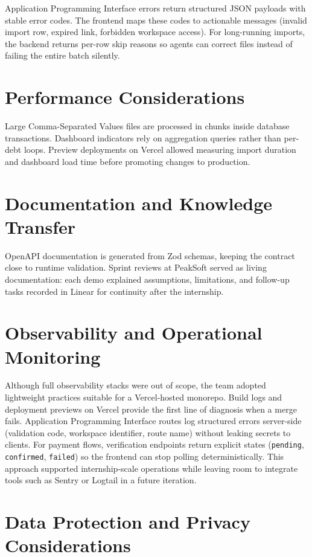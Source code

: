 \documentclass[12pt,a4paper]{report}
\begin{document}
Application Programming Interface errors return structured JSON payloads with stable error codes.
The frontend maps these codes to actionable messages (invalid import row, expired link,
forbidden workspace access).
For long-running imports, the backend returns per-row skip reasons so agents can correct files
instead of failing the entire batch silently.

\section{Performance Considerations}

Large Comma-Separated Values files are processed in chunks inside database transactions.
Dashboard indicators rely on aggregation queries rather than per-debt loops.
Preview deployments on Vercel allowed measuring import duration and dashboard load time before
promoting changes to production.

\section{Documentation and Knowledge Transfer}

OpenAPI documentation is generated from Zod schemas, keeping the contract close to runtime
validation.
Sprint reviews at PeakSoft served as living documentation: each demo explained assumptions,
limitations, and follow-up tasks recorded in Linear for continuity after the internship.

\section{Observability and Operational Monitoring}

Although full observability stacks were out of scope, the team adopted lightweight practices
suitable for a Vercel-hosted monorepo.
Build logs and deployment previews on Vercel provide the first line of diagnosis when a merge
fails.
Application Programming Interface routes log structured errors server-side (validation code,
workspace identifier, route name) without leaking secrets to clients.
For payment flows, verification endpoints return explicit states (\texttt{pending},
\texttt{confirmed}, \texttt{failed}) so the frontend can stop polling deterministically.
This approach supported internship-scale operations while leaving room to integrate tools such as
Sentry or Logtail in a future iteration.

\section{Data Protection and Privacy Considerations}
\end{document}
